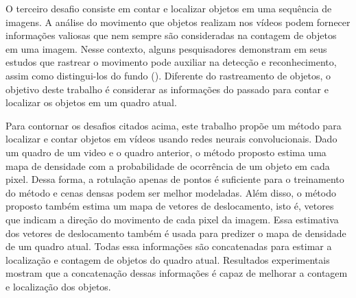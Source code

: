     O terceiro desafio consiste em contar e localizar objetos em uma sequência de imagens.
   A análise do movimento que objetos realizam nos vídeos podem fornecer informações valiosas que nem sempre são consideradas na contagem de objetos em uma imagem.
Nesse contexto, alguns pesquisadores demonstram em seus estudos que rastrear o movimento pode auxiliar na detecção e reconhecimento, assim como distingui-los do fundo (\cite{Ma_2015_ICCV,Nam_2016_CVPR,Danelljan_2015_ICCV_Workshops,WANG201962,8898173,ExtractHuman}).  
   Diferente do rastreamento de objetos, o objetivo deste trabalho é considerar as informações do passado para contar e localizar os objetos em um quadro atual.
    
    Para contornar os desafios citados acima, este trabalho propõe um método para localizar e contar objetos em vídeos usando redes neurais convolucionais.
    Dado um quadro de um video e o quadro anterior, o método proposto estima uma mapa de densidade com a probabilidade de ocorrência de um objeto em cada pixel.
    Dessa forma, a rotulação apenas de pontos é suficiente para o treinamento do método e cenas densas podem ser melhor modeladas.
    Além disso, o método proposto também estima um mapa de vetores de deslocamento, isto é, vetores que indicam a direção do movimento de cada pixel da imagem.
    Essa estimativa dos vetores de deslocamento também é usada para predizer o mapa de densidade de um quadro atual.
    Todas essa informações são concatenadas para estimar a localização e contagem de objetos do quadro atual.
    Resultados experimentais mostram que a concatenação dessas informações é capaz de melhorar a contagem e localização dos objetos.
    
    
    


